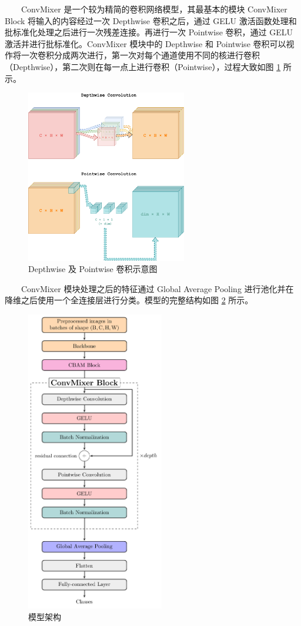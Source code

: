 \documentclass[twocolumn, fontsize=10pt]{article}
\begin{document}
　　ConvMixer\cite{trockman2022} 是一个较为精简的卷积网络模型，其最基本的模块 ConvMixer Block 将输入的内容经过一次 Depthwise 卷积之后，通过 GELU 激活函数处理和批标准化处理之后进行一次残差连接。再进行一次 Pointwise 卷积，通过 GELU 激活并进行批标准化。ConvMixer 模块中的 Depthwise 和 Pointwise 卷积可以视作将一次卷积分成两次进行，第一次对每个通道使用不同的核进行卷积（Depthwise），第二次则在每一点上进行卷积（Pointwise），过程大致如图 \ref{fig:depth_point_wise_conv} 所示。
\begin{figure}
    \centering
    \includegraphics[width=7cm]{depth_point_wise_conv.pdf}
    \caption{Depthwise 及 Pointwise 卷积示意图}
    \label{fig:depth_point_wise_conv}
\end{figure}

　　ConvMixer 模块处理之后的特征通过 Global Average Pooling\cite{lin2013} 进行池化并在降维之后使用一个全连接层进行分类。模型的完整结构如图 \ref{fig:model_structure} 所示。
\begin{figure}[h]
    \centering
    \includegraphics[width=6cm]{model.pdf}
    \caption{模型架构}
    \label{fig:model_structure}
\end{figure}
\end{document}
